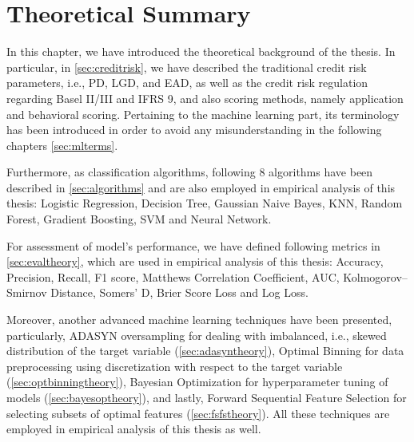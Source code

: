 \newpage
\section{Theoretical Summary}

In this chapter, we have introduced the theoretical background of the thesis.
In particular, in \autoref{sec:creditrisk}, we have described the traditional credit risk parameters, i.e., PD, LGD, and EAD, as well as the credit risk regulation regarding Basel II/III and IFRS 9, and also scoring methods, namely application and behavioral scoring.
Pertaining to the machine learning part, its terminology has been introduced in order to avoid any misunderstanding in the following chapters \autoref{sec:mlterms}.

Furthermore, as classification algorithms, following 8 algorithms have been described in \autoref{sec:algorithms} and are also employed in empirical analysis of this thesis: Logistic Regression, Decision Tree, Gaussian Naive Bayes, KNN, Random Forest, Gradient Boosting, SVM and Neural Network.

For assessment of model's performance, we have defined following metrics in \autoref{sec:evaltheory}, which are used in empirical analysis of this thesis: Accuracy, Precision, Recall, F1 score, Matthews Correlation Coefficient, AUC, Kolmogorov--Smirnov Distance, Somers' D, Brier Score Loss and Log Loss.

Moreover, another advanced machine learning techniques have been presented, particularly, ADASYN oversampling for dealing with imbalanced, i.e., skewed distribution of the target variable (\autoref{sec:adasyntheory}), Optimal Binning for data preprocessing using discretization with respect to the target variable (\autoref{sec:optbinningtheory}),
Bayesian Optimization for hyperparameter tuning of models (\autoref{sec:bayesoptheory}), and lastly, Forward Sequential Feature Selection for selecting subsets of optimal features (\autoref{sec:fsfstheory}).
All these techniques are employed in empirical analysis of this thesis as well.